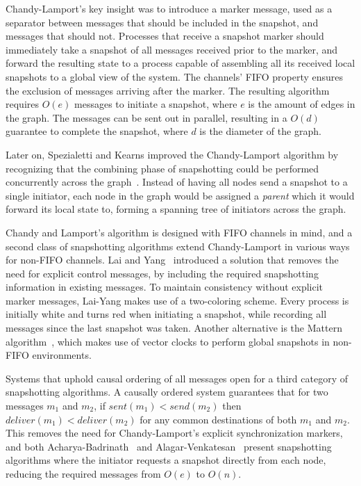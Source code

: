 Chandy-Lamport's key insight was to introduce a marker message, used as a
separator between messages that should be included in the snapshot, and messages
that should not. Processes that receive a snapshot marker should immediately
take a snapshot of all messages received prior to the marker, and forward the
resulting state to a process capable of assembling all its received local
snapshots to a global view of the system. The channels' FIFO property ensures
the exclusion of messages arriving after the marker. The resulting algorithm
requires $ O(e) $ messages to initiate a snapshot, where $ e $ is the amount of
edges in the graph. The messages can be sent out in parallel, resulting in a $
O(d) $ guarantee to complete the snapshot, where $ d $ is the diameter of the
graph.

Later on, Spezialetti and Kearns improved the Chandy-Lamport algorithm by
recognizing that the combining phase of snapshotting could be performed
concurrently across the graph~\cite{spez-k}. Instead of having all nodes send a
snapshot to a single initiator, each node in the graph would be assigned a
\textit{parent} which it would forward its local state to, forming a spanning
tree of initiators across the graph.

Chandy and Lamport's algorithm is designed with FIFO channels in mind, and a
second class of snapshotting algorithms extend Chandy-Lamport in various ways
for non-FIFO channels. Lai and Yang~\cite{lai-yang} introduced a solution that
removes the need for explicit control messages, by including the required
snapshotting information in existing messages. To maintain consistency without
explicit marker messages, Lai-Yang makes use of a two-coloring scheme. Every
process is initially white and turns red when initiating a snapshot, while
recording all messages since the last snapshot was taken. Another alternative is
the Mattern algorithm~\cite{mattern}, which makes use of vector clocks to
perform global snapshots in non-FIFO environments.

Systems that uphold causal ordering of all messages open for a third category of
snapshotting algorithms. A causally ordered system guarantees that for two
messages $ m_1 $ and $ m_2 $, if $ sent(m_1) < send(m_2) $ then $ deliver(m_1) <
deliver(m_2) $ for any common destinations of both $ m_1 $ and $ m_2 $. This
removes the need for Chandy-Lamport's explicit synchronization markers, and both
Acharya-Badrinath~\cite{acharya} and Alagar-Venkatesan~\cite{alagar} present
snapshotting algorithms where the initiator requests a snapshot directly from
each node, reducing the required messages from $ O(e) $ to $ O(n) $.

